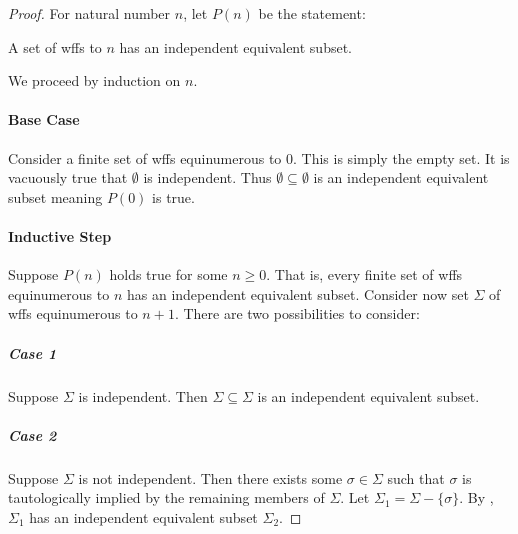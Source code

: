 \documentclass{report}
\begin{document}
  \begin{proof}

    For natural number $n$, let $P(n)$ be the statement:
      \begin{induction}
        A set of wffs  to $n$ has an independent
          equivalent subset.
      \end{induction}
    \noindent
    We proceed by induction on $n$.

    \paragraph{Base Case}%

      Consider a finite set of wffs equinumerous to $0$.
      This is simply the empty set.
      It is vacuously true that $\emptyset$ is independent.
      Thus $\emptyset \subseteq \emptyset$ is an independent equivalent subset
        meaning $P(0)$ is true.

    \paragraph{Inductive Step}%

      Suppose $P(n)$ holds true for some $n \geq 0$.
      That is, every finite set of wffs equinumerous to $n$ has an independent
        equivalent subset.
      Consider now set $\Sigma$ of wffs equinumerous to $n + 1$.
      There are two possibilities to consider:

      \subparagraph{Case 1}%

        Suppose $\Sigma$ is independent.
        Then $\Sigma \subseteq \Sigma$ is an independent equivalent subset.

      \subparagraph{Case 2}%

        Suppose $\Sigma$ is not independent.
        Then there exists some $\sigma \in \Sigma$ such that $\sigma$ is
          tautologically implied by the remaining members of $\Sigma$.
        Let $\Sigma_1 = \Sigma - \{\sigma\}$.
        By , $\Sigma_1$ has an independent
          equivalent subset $\Sigma_2$.


\end{proof}
\end{document}
